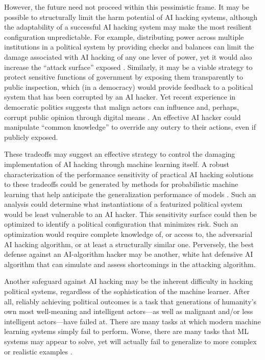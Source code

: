 \documentclass[nonacm,12pt]{acmart}
\begin{document}
However, the future need not proceed within this pessimistic frame. It may be possible to structurally limit the harm potential of AI hacking systems, although the adaptability of a successful AI hacking system may make the most resilient configuration unpredictable. For example, distributing power across multiple institutions in a political system by providing checks and balances can limit the damage associated with AI hacking of any one lever of power, yet it would also increase the ``attack surface'' exposed \cite[as defined in cybersecurity, e.g.,][]{farrell_common-knowledge_2018, adnan_analytical_2019}.  Similarly, it may be a viable strategy to protect sensitive functions of government by exposing them transparently to public inspection, which (in a democracy) would provide feedback to a political system that has been corrupted by an AI hacker.  Yet recent experience in democratic politics suggests that malign actors can influence and, perhaps, corrupt public opinion through digital means \cite{lin_cyber-enabled_2019}. An effective AI hacker could manipulate ``common knowledge'' \cite{farrell_common-knowledge_2018} to override any outcry to their actions, even if publicly exposed.

These tradeoffs may suggest an effective strategy to control the damaging implementation of AI hacking through machine learning itself. 
A robust characterization of the performance sensitivity of practical AI hacking solutions to these tradeoffs could be generated by methods for probabilistic machine learning that help anticipate the generalization performance of models \cite[e.g.,][]{wilson_bayesian_2020}. 
Such an analysis could determine what instantiations of a featurized political system would be least vulnerable to an AI hacker. This sensitivity surface could then be optimized to identify a political configuration that minimizes risk. 
Such an optimization would require complete knowledge of, or access to, the adversarial AI hacking algorithm, or at least a structurally similar one.  
Perversely, the best defense against an AI-algorithm hacker may be another, white hat defensive AI algorithm that can simulate and assess shortcomings in the attacking algorithm.

Another safeguard against AI hacking may be the inherent difficulty in hacking political systems, regardless of the sophistication of the machine learner.  After all, reliably achieving political outcomes is a task that generations of humanity's own most well-meaning and intelligent actors---as well as malignant and/or less intelligent actors---have failed at. There are many tasks at which modern machine learning systems simply fail to perform. Worse, there are many tasks that ML systems may appear to solve, yet will actually fail to generalize to more complex or realistic examples \cite{damour_underspecification_2020, geirhos_shortcut_2020}.
\end{document}
